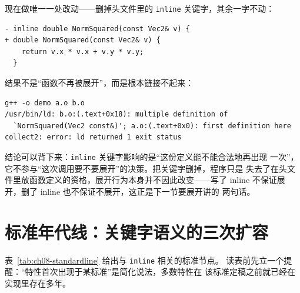 \documentclass[12pt,a4paper,fontset=fandol]{ctexbook}
\newcommand{\Tp}[1]{\texttt{#1}}
\begin{document}
现在做唯一一处改动——删掉头文件里的 \Tp{inline} 关键字，其余一字不动：

\begin{lstlisting}[style=diffstyle]
- inline double NormSquared(const Vec2& v) {
+ double NormSquared(const Vec2& v) {
    return v.x * v.x + v.y * v.y;
  }
\end{lstlisting}

结果不是``函数不再被展开''，而是根本链接不起来：

\begin{lstlisting}[style=shellstyle]
g++ -o demo a.o b.o
/usr/bin/ld: b.o:(.text+0x18): multiple definition of
  `NormSquared(Vec2 const&)'; a.o:(.text+0x0): first definition here
collect2: error: ld returned 1 exit status
\end{lstlisting}

结论可以背下来：\Tp{inline} 关键字影响的是``这份定义能不能合法地再出现
一次''，它不参与``这次调用要不要展开''的决策。把关键字删掉，程序只是
失去了在头文件里放函数定义的资格，展开行为本身并不因此改变——写了
inline 不保证展开，删了 inline 也不保证不展开，这正是下一节要展开讲的
两句话。

\section{标准年代线：关键字语义的三次扩容}
\label{sec:ch08-standardline}

表~\ref{tab:ch08-standardline} 给出与 \Tp{inline} 相关的标准节点。
读表前先立一个提醒：``特性首次出现于某标准''是简化说法，多数特性在
该标准定稿之前就已经在实现里存在多年。
\end{document}
